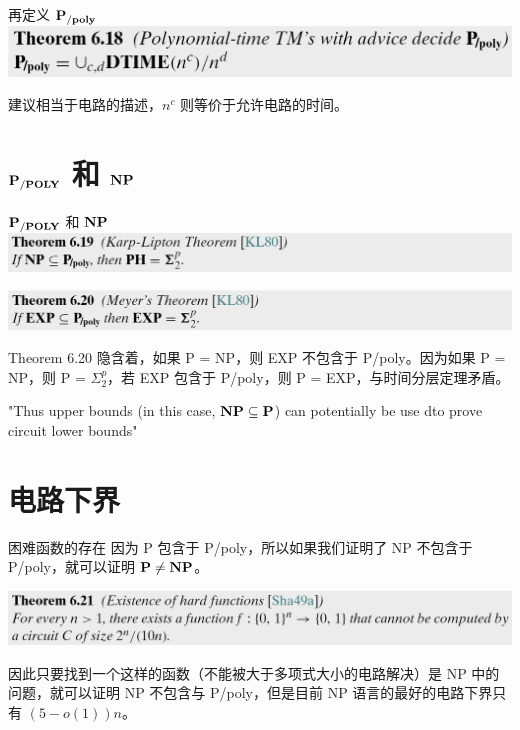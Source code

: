 \documentclass[UTF8,aspectratio=169,mathserif]{beamer}
\begin{document}
	\begin{frame}{再定义 $\bf P_{/poly}$}
		\includegraphics[width=\linewidth]{../../5 & 6/note.assets/image-20210427152742956.png}\newline
		
		建议相当于电路的描述，$n^c$ 则等价于允许电路的时间。
	\end{frame}
	
	\section{$\bf P_{/POLY}$ 和 $\bf NP$}
	\begin{frame}{$\bf P_{/POLY}$ 和 $\bf NP$}
		\includegraphics[width=\linewidth]{../../5 & 6/note.assets/image-20210427154847848.png}\newline
		
		\includegraphics[width=\linewidth]{../../5 & 6/note.assets/image-20210427154857049.png}\newline
		
		Theorem 6.20 隐含着，如果 P = NP，则 EXP 不包含于 P/poly。因为如果 P = NP，则 P = $\Sigma_2^p$，若 EXP 包含于 P/poly，则 P = EXP，与时间分层定理矛盾。\newline
		
		"Thus upper bounds (in this case, $\bf NP\subseteq P$) can potentially be use dto prove circuit lower bounds"
	\end{frame}
	
	\section{电路下界}
	\begin{frame}{困难函数的存在}
		因为 P 包含于 P/poly，所以如果我们证明了 NP 不包含于 P/poly，就可以证明 $\bf P\neq NP$。\newline
		
		\includegraphics[width=\linewidth]{../../5 & 6/note.assets/image-20210427160637215.png}\newline
		
		因此只要找到一个这样的函数（不能被大于多项式大小的电路解决）是 NP 中的问题，就可以证明 NP 不包含与 P/poly，但是目前 NP 语言的最好的电路下界只有 $(5-o(1))n$。
	\end{frame}
\end{document}
